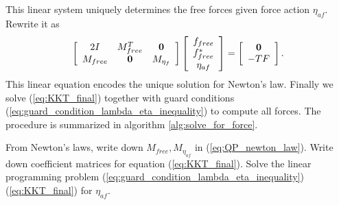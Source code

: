 This linear system uniquely determines the free forces given force action $\eta_{af}$. Rewrite it as
\begin{equation}
  \label{eq:KKT_final}
  \left[ {\begin{array}{*{20}{c}}{2I}&{M_{free}^T}&{\bf{0}}\\{{M_{free}}}&{\bf{0}}&{{M_{{\eta _f}}}}\end{array}} \right]\left[ {\begin{array}{*{20}{c}}f_{free}\\f_{free}^*\\\eta_{af}\end{array}} \right] = \left[ {\begin{array}{*{20}{c}}{\bf{0}}\\{ - TF}\end{array}} \right].
\end{equation}
This linear equation encodes the unique solution for Newton's law. Finally we solve (\ref{eq:KKT_final}) together with guard conditions (\ref{eq:guard_condition_lambda_eta_inequality}) to compute all forces. The procedure is summarized in algorithm \ref{alg:solve_for_force}.
\begin{algorithm}[h]
\caption{Solve for force controlled actions}  \label{alg:solve_for_force}
\begin{algorithmic}[1]
\STATE From Newton's laws, write down $M_{free}, M_{\eta_{af}}$ in (\ref{eq:QP_newton_law}).
\STATE Write down coefficient matrices for equation (\ref{eq:KKT_final}).
\STATE Solve the linear programming problem (\ref{eq:guard_condition_lambda_eta_inequality})(\ref{eq:KKT_final}) for $\eta_{af}$.
\end{algorithmic}
\end{algorithm}


